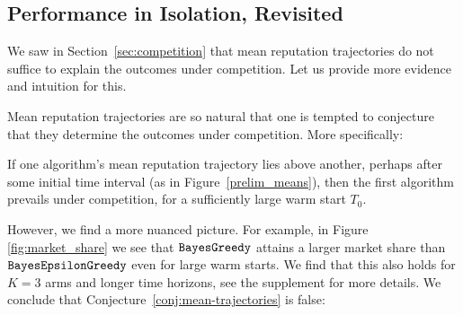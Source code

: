 \documentclass[../competing_bandits_with_appendix.tex]{subfiles}
\begin{document}
\subsection{Performance in Isolation, Revisited}\label{sec:revisited}


We saw in Section~\ref{sec:competition} that mean reputation trajectories do not suffice to explain the outcomes under competition. Let us provide more evidence and intuition for this.

Mean reputation trajectories are so natural that one is tempted to conjecture that they determine the outcomes under competition. More specifically:
\begin{conjecture}\label{conj:mean-trajectories}
If one algorithm's mean reputation trajectory lies above another, perhaps after some initial time interval (\eg as in Figure~\ref{prelim_means}), then the first algorithm prevails under competition, for a sufficiently large warm start $T_0$.
\end{conjecture}

However, we find a more nuanced picture. For example, in Figure \ref{fig:market_share} we see that $\mathtt{BayesGreedy}$ attains a larger market share than $\mathtt{BayesEpsilonGreedy}$ even for large warm starts. We find that this also holds for $K = 3$ arms and longer time horizons, see the supplement for more details. We conclude that Conjecture~\ref{conj:mean-trajectories} is false:
\end{document}
